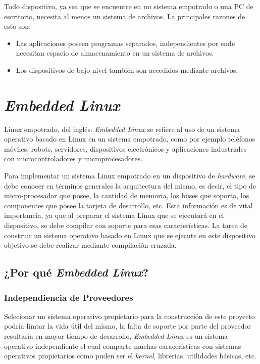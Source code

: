 Todo dispositivo, ya sea que se encuentre en un sistema empotrado o una PC de
escritorio, necesita al menos un sistema de archivos. La principales razones de
esto son:

\begin{itemize}
 \item Las aplicaciones poseen programas separados, independientes por ende
necesitan espacio de almacenamiento en un sistema de archivos.
 \item Los dispositivos de bajo nivel también son accedidos mediante archivos.
\end{itemize}

\section{\emph{Embedded Linux}}

Linux empotrado, del inglés: \emph{Embedded Linux} se refiere al uso de un
sistema operativo basado en Linux en un sistema empotrado, como por ejemplo
teléfonos móviles, robots, servidores, dispositivos electrónicos y aplicaciones
industriales con microcontroladores y microprocesadores\cite{embedded}.

Para implementar un sistema Linux empotrado en un dispositivo de
\emph{hardware}, se debe conocer en términos generales la arquitectura del
mismo, es decir, el tipo de micro-procesador que posee, la cantidad de memoria,
los buses que soporta, los componentes que posee la tarjeta de desarrollo,
etc. Esta información es de vital importancia, ya que al preparar el sistema
Linux que se ejecutará en el dispositivo, se debe compilar con soporte
para esas características. La tarea de construir un sistema operativo
basado en Linux que se ejecute en este dispositivo objetivo se debe
realizar mediante compilación cruzada.

\subsection{¿Por qué \emph{Embedded Linux}?}
 
\subsubsection{Independiencia de Proveedores}

Selecionar un sistema operativo propietario para la construcción de este
proyecto podría limtar la vida útil del mismo, la falta de  soporte por parte
del proveedor resultaría en mayor tiempo de desarrollo, \emph{Embedded Linux}
es un sistema operativo independiente el cual comparte muchas caraceristícas
con sistemas operativos propietarios como puden ser el \emph{kernel},
librerias, utilidades básicas, etc.

